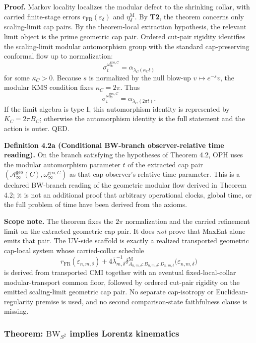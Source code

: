 \textbf{Proof.} Markov locality localizes the modular defect to the shrinking collar, with carried finite-stage errors \(r_{\mathrm{FR}}(\varepsilon_\delta)\) and \(\eta_\delta^{\mathrm M}\). By \textbf{T2}, the theorem concerns only scaling-limit cap pairs. By the theorem-local extraction hypothesis, the relevant limit object is the prime geometric cap pair. Ordered cut-pair rigidity identifies the scaling-limit modular automorphism group with the standard cap-preserving conformal flow up to normalization:
\[
\sigma_t^{\omega_\infty^{\mathrm{geo},C}}
=
\alpha_{\lambda_C(\kappa_C t)}
\]
for some \(\kappa_C>0\). Because \(s\) is normalized by the null blow-up \(v\mapsto e^{-s}v\), the modular KMS condition fixes \(\kappa_C=2\pi\). Thus
\[
\sigma_t^{\omega_\infty^{\mathrm{geo},C}}
=
\alpha_{\lambda_C(2\pi t)}.
\]
If the limit algebra is type I, this automorphism identity is represented by \(K_C=2\pi B_C\); otherwise the automorphism identity is the full statement and the action is outer. QED.

\textbf{Definition 4.2a (Conditional BW-branch observer-relative time reading).}
On the branch satisfying the hypotheses of Theorem 4.2, OPH uses the modular automorphism
parameter \(t\) of the extracted cap pair
\((\mathcal A_\infty^{\mathrm{geo}}(C),\omega_\infty^{\mathrm{geo},C})\) as that cap
observer's relative time parameter. This is a declared BW-branch reading of the geometric
modular flow derived in Theorem 4.2; it is not an additional proof that arbitrary operational
clocks, global time, or the full problem of time have been derived from the axioms.

\textbf{Scope note.} The theorem fixes the \(2\pi\) normalization and the carried refinement limit on the extracted geometric cap pair. It does \emph{not} prove that MaxEnt alone emits that pair. The UV-side scaffold is exactly a realized transported geometric cap-local system whose carried-collar schedule
\[
r_{\mathrm{FR}}(\varepsilon_{n,m,\delta})
+
4\bar\lambda_{m,\delta}^{-1}
\delta^{\mathrm{M}}_{A_{n,m,\delta}:B_{n,m,\delta}:D_{n,m,\delta}}
\bigl(\varepsilon_{n,m,\delta}\bigr)
\]
is derived from transported CMI together with an eventual fixed-local-collar modular-transport common floor, followed by ordered cut-pair rigidity on the emitted scaling-limit geometric cap pair. No separate cap-isotropy or Euclidean-regularity premise is used, and no second comparison-state faithfulness clause is missing.
\subsubsection{\texorpdfstring{Theorem: \(\mathrm{BW}_{S^2}\) implies Lorentz kinematics}{4.3 Theorem: \textbackslash mathrm\{BW\}\_\{S\^{}2\} implies Lorentz kinematics}}\label{43-theorem-mathrmbw_s2-implies-lorentz-kinematics}

